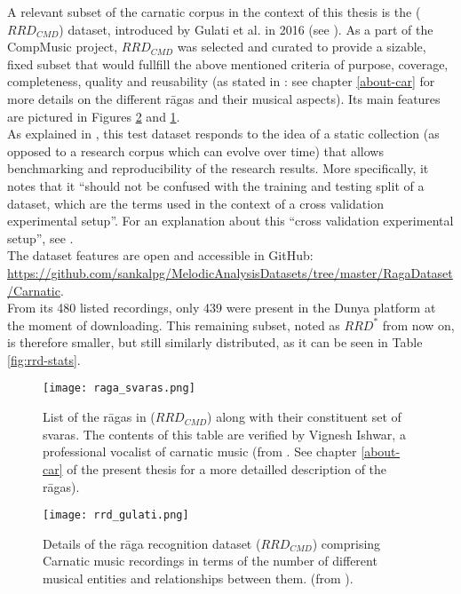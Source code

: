 A relevant subset of the carnatic corpus in the context of this thesis is the (\(RRD_{CMD}\)) dataset, introduced by Gulati et al. in 2016 (see \cite[p.84]{gulati}). As a part of the CompMusic project, \(RRD_{CMD}\) was selected and curated to provide a sizable, fixed subset that would fullfill the above mentioned criteria of purpose, coverage, completeness, quality and reusability (as stated in \cite[pages 7, 10 and 83]{gulati}: see chapter \ref{about-car} for more details on the different r\=agas and their musical aspects).  Its main features are pictured in Figures \ref{fig:rrd-overall} and \ref{fig:rrd-ragasvaras}.\\

As explained in \cite[p.61]{gulati}, this test dataset responds to the idea of a static collection (as opposed to a research corpus which can evolve over time) that allows benchmarking and reproducibility of the research results. More specifically, it notes that it ``should not be confused with the training and testing split of a dataset, which are the terms used in the context of a cross validation experimental setup''. For an explanation about this ``cross validation experimental setup'', see \cite[p.121]{goodfellow}.\\

The dataset features are open and accessible in GitHub: \url{https://github.com/sankalpg/MelodicAnalysisDatasets/tree/master/RagaDataset/Carnatic}.\\
From its 480 listed recordings, only 439 were present in the Dunya platform at the moment of downloading. This remaining subset, noted as \(RRD^*\) from now on, is therefore smaller, but still similarly distributed, as it can be seen in Table \ref{fig:rrd-stats}.

\begin{figure}[h]
  \centering
  \texttt{[image: raga\_svaras.png]}
  \caption{List of the r\=agas in (\(RRD_{CMD}\)) along with their constituent set of svaras. The contents of this table are verified by Vignesh Ishwar, a professional vocalist of carnatic music (from \cite[p.244]{gulati}. See chapter \ref{about-car} of the present thesis for a more detailled description of the r\=agas).}
  \label{fig:rrd-ragasvaras}
\end{figure}

\begin{figure}[h]
  \centering
  \texttt{[image: rrd\_gulati.png]}
  \caption{Details of the rāga recognition dataset (\(RRD_{CMD}\)) comprising Carnatic music recordings in terms of the number of different musical entities and relationships between them. (from \cite[p.85]{gulati}).}
  \label{fig:rrd-overall}
\end{figure}
